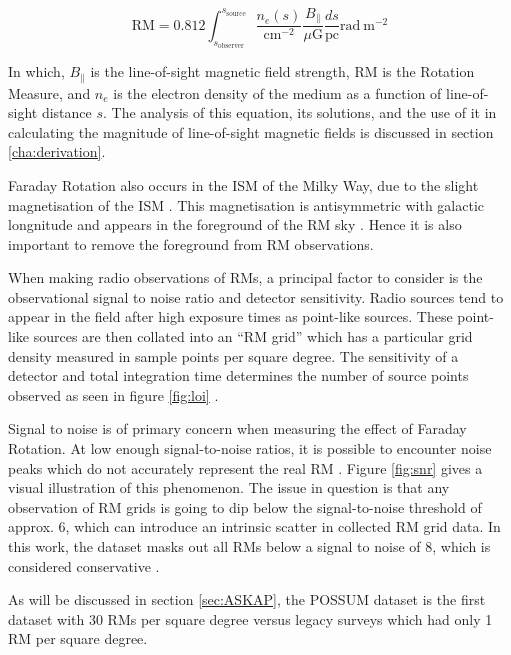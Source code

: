 \begin{equation}
    \mathrm{RM} = 0.812 \int_{s_{\mathrm{observer}}}^{s_{\mathrm{source}}}{\frac{n_e(s)}{\mathrm{cm^{-2}}}\frac{B_{\parallel}}{\mu\mathrm{G}}\frac{ds}{\mathrm{pc}}} \mathrm{rad~m^{-2}}
    \label{eq:rm_integral}
\end{equation}


In which, $B_{\parallel}$ is the line-of-sight magnetic field strength, $\mathrm{RM}$ is the Rotation Measure, and $n_e$ is the electron density of the medium as a function of line-of-sight distance $s$. The analysis of this equation, its solutions, and the use of it in calculating the magnitude of line-of-sight magnetic fields is discussed in section \ref{cha:derivation}.


Faraday Rotation also occurs in the ISM of the Milky Way, due to the slight magnetisation of the ISM \citep{ID37, ID30, ID21}. This magnetisation is antisymmetric with galactic longnitude and appears in the foreground of the RM sky \citep{ID30}. Hence it is also important to remove the foreground from RM observations.


When making radio observations of RMs, a principal factor to consider is the observational signal to noise ratio and detector sensitivity. Radio sources tend to appear in the field after high exposure times as point-like sources. These point-like sources are then collated into an “RM grid” which has a particular grid density measured in sample points per square degree. The sensitivity of a detector and total integration time determines the number of source points observed as seen in figure \ref{fig:loi} \citep{ID59}.



Signal to noise is of primary concern when measuring the effect of Faraday Rotation. At low enough signal-to-noise ratios, it is possible to encounter noise peaks which do not accurately represent the real RM \citep{ID60}. Figure \ref{fig:snr} gives a visual illustration of this phenomenon. The issue in question is that any observation of RM grids is going to dip below the signal-to-noise threshold of approx. 6, which can introduce an intrinsic scatter in collected RM grid data. In this work, the dataset masks out all RMs below a signal to noise of 8, which is considered conservative \citep{ID71}.


As will be discussed in section \ref{sec:ASKAP}, the POSSUM dataset is the first dataset with 30 RMs per square degree versus legacy surveys which had only 1 RM per square degree.

